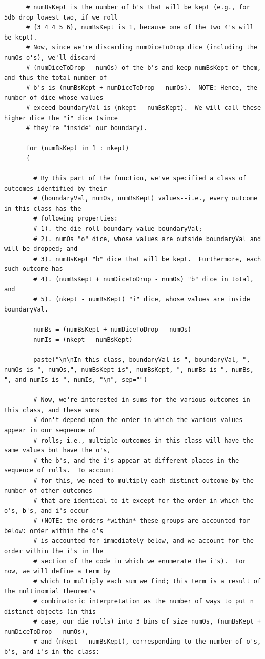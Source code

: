 \documentclass[12pt]{article}
\begin{document}
\begin{lstlisting}
      # numBsKept is the number of b's that will be kept (e.g., for 5d6 drop lowest two, if we roll
      # {3 4 4 5 6}, numBsKept is 1, because one of the two 4's will be kept).
      # Now, since we're discarding numDiceToDrop dice (including the numOs o's), we'll discard 
      # (numDiceToDrop - numOs) of the b's and keep numBsKept of them, and thus the total number of
      # b's is (numBsKept + numDiceToDrop - numOs).  NOTE: Hence, the number of dice whose values
      # exceed boundaryVal is (nkept - numBsKept).  We will call these higher dice the "i" dice (since
      # they're "inside" our boundary).
      
      for (numBsKept in 1 : nkept)
      {
        
        # By this part of the function, we've specified a class of outcomes identified by their 
        # (boundaryVal, numOs, numBsKept) values--i.e., every outcome in this class has the
        # following properties:
        # 1). the die-roll boundary value boundaryVal; 
        # 2). numOs "o" dice, whose values are outside boundaryVal and will be dropped; and
        # 3). numBsKept "b" dice that will be kept.  Furthermore, each such outcome has
        # 4). (numBsKept + numDiceToDrop - numOs) "b" dice in total, and 
        # 5). (nkept - numBsKept) "i" dice, whose values are inside boundaryVal.
        
        numBs = (numBsKept + numDiceToDrop - numOs)
        numIs = (nkept - numBsKept)
        
        paste("\n\nIn this class, boundaryVal is ", boundaryVal, ", numOs is ", numOs,", numBsKept is", numBsKept, ", numBs is ", numBs, ", and numIs is ", numIs, "\n", sep="")
        
        # Now, we're interested in sums for the various outcomes in this class, and these sums
        # don't depend upon the order in which the various values appear in our sequence of
        # rolls; i.e., multiple outcomes in this class will have the same values but have the o's,
        # the b's, and the i's appear at different places in the sequence of rolls.  To account
        # for this, we need to multiply each distinct outcome by the number of other outcomes
        # that are identical to it except for the order in which the o's, b's, and i's occur
        # (NOTE: the orders *within* these groups are accounted for below: order within the o's 
        # is accounted for immediately below, and we account for the order within the i's in the
        # section of the code in which we enumerate the i's).  For now, we will define a term by
        # which to multiply each sum we find; this term is a result of the multinomial theorem's 
        # combinatoric interpretation as the number of ways to put n distinct objects (in this 
        # case, our die rolls) into 3 bins of size numOs, (numBsKept + numDiceToDrop - numOs), 
        # and (nkept - numBsKept), corresponding to the number of o's, b's, and i's in the class:
        

\end{lstlisting}
\end{document}
